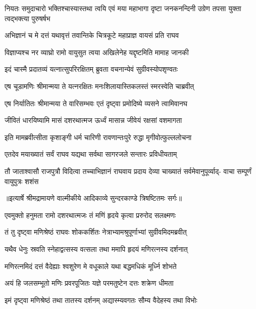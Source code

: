 \threelineshloka
{नियतः समुदाचारो भक्तिश्चास्यास्तथा त्वयि}
{एवं मया महाभागा दृष्टा जनकनन्दिनी}
{उग्रेण तपसा युक्ता त्वद्भक्त्या पुरुषर्षभ} %

\twolineshloka
{अभिज्ञानं च मे दत्तं यथावृत्तं तवान्तिके}
{चित्रकूटे महाप्राज्ञ वायसं प्रति राघव} %

\twolineshloka
{विज्ञाप्यश्च नर व्याघ्रो रामो वायुसुत त्वया}
{अखिलेनेह यद्दृष्टमिति मामाह जानकी} %

\twolineshloka
{इदं चास्मै प्रदातव्यं यत्नात्सुपरिरक्षितम्}
{ब्रुवता वचनान्येवं सुग्रीवस्योपशृण्वतः} %

\twolineshloka
{एष चूडामणिः श्रीमान्मया ते यत्नरक्षितः}
{मनःशिलायास्तिकलस्तं स्मरस्वेति चाब्रवीत्} %

\twolineshloka
{एष निर्यातितः श्रीमान्मया ते वारिसम्भवः}
{एतं दृष्ट्वा प्रमोदिष्ये व्यसने त्वामिवानघ} %

\twolineshloka
{जीवितं धारयिष्यामि मासं दशरथात्मज}
{ऊर्ध्वं मासान्न जीवेयं रक्षसां वशमागता} %

\twolineshloka
{इति मामब्रवीत्सीता कृशाङ्गी धर्म चारिणी}
{रावणान्तःपुरे रुद्धा मृगीवोत्फुल्ललोचना} %

\twolineshloka
{एतदेव मयाख्यातं सर्वं राघव यद्यथा}
{सर्वथा सागरजले सन्तारः प्रविधीयताम्} %

\fourlineindentedshloka
{तौ जाताश्वासौ राजपुत्रौ विदित्वा}
{तच्चाभिज्ञानं राघवाय प्रदाय}
{देव्या चाख्यातं सर्वमेवानुपूर्व्याद्-}
{वाचा सम्पूर्णं वायुपुत्रः शशंस} %


{॥इत्यार्षे श्रीमद्रामायणे वाल्मीकीये आदिकाव्ये सुन्दरकाण्डे त्रिषष्टितमः सर्गः॥}


\twolineshloka
{एवमुक्तो हनुमता रामो दशरथात्मजः}
{तं मणिं हृदये कृत्वा प्ररुरोद सलक्ष्मणः} %

\twolineshloka
{तं तु दृष्ट्वा मणिश्रेष्ठं राघवः शोककर्शितः}
{नेत्राभ्यामश्रुपूर्णाभ्यां सुग्रीवमिदमब्रवीत्} %

\twolineshloka
{यथैव धेनुः स्रवति स्नेहाद्वत्सस्य वत्सला}
{तथा ममापि हृदयं मणिरत्नस्य दर्शनात्} %

\twolineshloka
{मणिरत्नमिदं दत्तं वैदेह्याः श्वशुरेण मे}
{वधूकाले यथा बद्धमधिकं मूर्ध्नि शोभते} %

\twolineshloka
{अयं हि जलसम्भूतो मणिः प्रवरपूजितः}
{यज्ञे परमतुष्टेन दत्तः शक्रेण धीमता} %

\twolineshloka
{इमं दृष्ट्वा मणिश्रेष्ठं तथा तातस्य दर्शनम्}
{अद्यास्म्यवगतः सौम्य वैदेहस्य तथा विभोः} %


